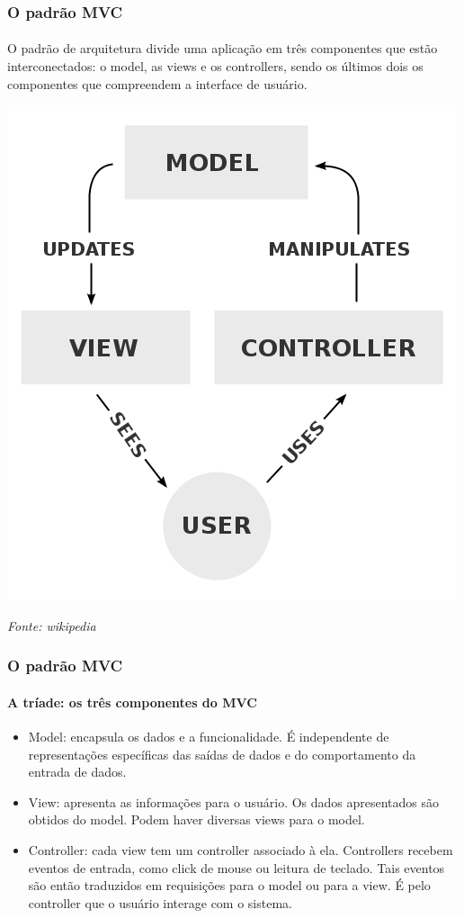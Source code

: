 \documentclass{beamer}
\begin{document}
\begin{frame}
\frametitle{O padrão MVC}
\framesubtitle{}
	O padrão de arquitetura divide uma aplicação em três componentes que estão interconectados: o model, as views e os controllers, sendo os últimos dois os componentes que compreendem a interface de usuário.
\begin{center}
	\includegraphics[scale=0.2]{MVC.jpg}
\end{center}
\begin{center}
	\tiny{\textit{Fonte: wikipedia}}
\end{center}
\end{frame}

\begin{frame}
\frametitle{O padrão MVC}
\framesubtitle{A tríade: os três componentes do MVC}
\begin{itemize}
	\item Model: encapsula os dados e a funcionalidade. É independente de representações específicas das saídas de dados e do comportamento da entrada de dados.
	\item View: apresenta as informações para o usuário. Os dados apresentados são obtidos do model. Podem haver diversas views para o model.
	\item Controller: cada view tem um controller associado à ela. Controllers recebem eventos de entrada, como click de mouse ou leitura de teclado. Tais eventos são então traduzidos em requisições para o model ou para a view. É pelo controller que o usuário interage com o sistema.
\end{itemize}
\end{frame}
\end{document}

